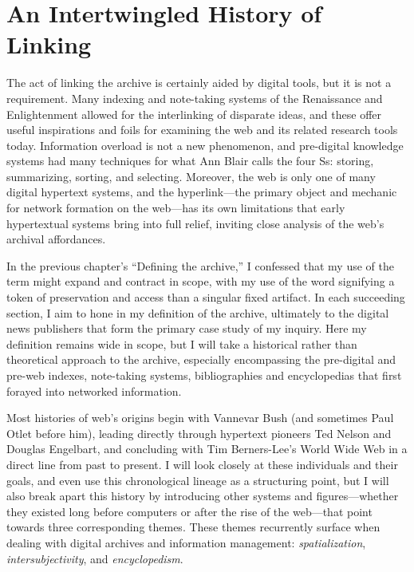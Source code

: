 \chapter{An Intertwingled History of Linking}

The act of linking the archive is certainly aided by digital tools, but it is not a requirement. Many indexing and note-taking systems of the Renaissance and Enlightenment allowed for the interlinking of disparate ideas, and these offer useful inspirations and foils for examining the web and its related research tools today. Information overload is not a new phenomenon, and pre-digital knowledge systems had many techniques for what Ann Blair calls the four Ss: storing, summarizing, sorting, and selecting.\autocite{blair_note_2004} Moreover, the web is only one of many digital hypertext systems, and the hyperlink---the primary object and mechanic for network formation on the web---has its own limitations that early hypertextual systems bring into full relief, inviting close analysis of the web's archival affordances.

In the previous chapter's ``Defining the archive,'' I confessed that my use of the term might expand and contract in scope, with my use of the word signifying a token of preservation and access than a singular fixed artifact. In each succeeding section, I aim to hone in my definition of the archive, ultimately to the digital news publishers that form the primary case study of my inquiry. Here my definition remains wide in scope, but I will take a historical rather than theoretical approach to the archive, especially encompassing the pre-digital and pre-web indexes, note-taking systems, bibliographies and encyclopedias that first forayed into networked information.

Most histories of web's origins begin with Vannevar Bush (and sometimes Paul Otlet before him), leading directly through hypertext pioneers Ted Nelson and Douglas Engelbart, and concluding with Tim Berners-Lee's World Wide Web in a direct line from past to present. I will look closely at these individuals and their goals, and even use this chronological lineage as a structuring point, but I will also break apart this history by introducing other systems and figures---whether they existed long before computers or after the rise of the web---that point towards three corresponding themes. These themes recurrently surface when dealing with digital archives and information management: \emph{spatialization}, \emph{intersubjectivity}, and \emph{encyclopedism}.

